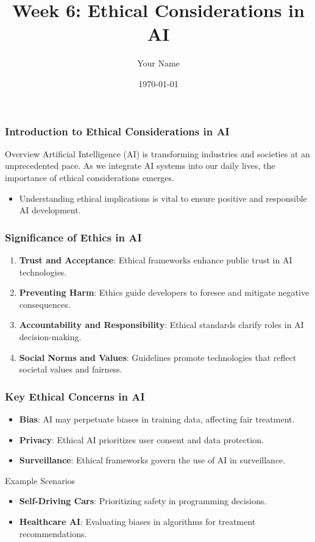 \documentclass{beamer}
\title{Week 6: Ethical Considerations in AI}
\author{Your Name}
\institute{Your Institution}
\date{\today}
\begin{document}
\frame{\titlepage}

\begin{frame}[fragile]
    \frametitle{Introduction to Ethical Considerations in AI}
    \begin{block}{Overview}
        Artificial Intelligence (AI) is transforming industries and societies at an unprecedented pace. As we integrate AI systems into our daily lives, the importance of ethical considerations emerges.
    \end{block}
    \begin{itemize}
        \item Understanding ethical implications is vital to ensure positive and responsible AI development.
    \end{itemize}
\end{frame}

\begin{frame}[fragile]
    \frametitle{Significance of Ethics in AI}
    \begin{enumerate}
        \item \textbf{Trust and Acceptance}: Ethical frameworks enhance public trust in AI technologies.
        \item \textbf{Preventing Harm}: Ethics guide developers to foresee and mitigate negative consequences.
        \item \textbf{Accountability and Responsibility}: Ethical standards clarify roles in AI decision-making.
        \item \textbf{Social Norms and Values}: Guidelines promote technologies that reflect societal values and fairness.
    \end{enumerate}
\end{frame}

\begin{frame}[fragile]
    \frametitle{Key Ethical Concerns in AI}
    \begin{itemize}
        \item \textbf{Bias}: AI may perpetuate biases in training data, affecting fair treatment.
        \item \textbf{Privacy}: Ethical AI prioritizes user consent and data protection.
        \item \textbf{Surveillance}: Ethical frameworks govern the use of AI in surveillance.
    \end{itemize}
    \begin{block}{Example Scenarios}
        \begin{itemize}
            \item \textbf{Self-Driving Cars}: Prioritizing safety in programming decisions.
            \item \textbf{Healthcare AI}: Evaluating biases in algorithms for treatment recommendations.
        \end{itemize}
    \end{block}
\end{frame}
\end{document}
